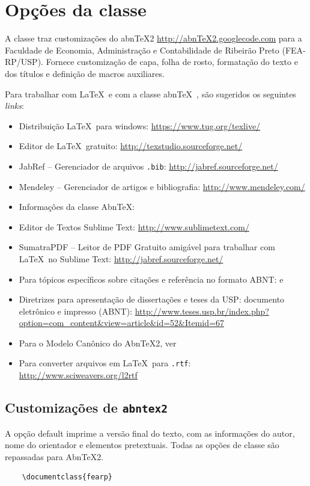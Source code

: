 \documentclass[rec]{fearp}
\begin{document}
\chapter{Opções da classe}

A classe traz customizações do abnTeX2 \url{http://abnTeX2.googlecode.com} para a Faculdade de Economia, Administração e Contabilidade de Ribeirão Preto (FEA-RP/USP). Fornece customização de capa, folha de rosto, formatação do texto e dos títulos e definição de macros auxiliares. 

Para trabalhar com \LaTeX\ e com a classe abn\TeX\ , são sugeridos os seguintes \textit{links}:
\begin{itemize}
  \item Distribuição \LaTeX\ para windows: \url{https://www.tug.org/texlive/}
  \item Editor de \LaTeX\ gratuito: \url{http://texstudio.sourceforge.net/}
  \item JabRef -- Gerenciador de arquivos \texttt{.bib}: \url{http://jabref.sourceforge.net/}
  \item Mendeley -- Gerenciador de artigos e bibliografia: \url{http://www.mendeley.com/}
  \item Informações da classe Abn\TeX : 
  \item Editor de Textos Sublime Text: \url{http://www.sublimetext.com/}
  \item SumatraPDF -- Leitor de PDF Gratuito amigável para trabalhar com \LaTeX\ no Sublime Text: \url{http://jabref.sourceforge.net/}
  \item Para tópicos específicos sobre citações e referência no formato ABNT: \cite{abntex22013b} e \cite{abntex22013c}
  \item Diretrizes para apresentação de dissertações e teses da USP: documento eletrônico e impresso (ABNT): \url{http://www.teses.usp.br/index.php?option=com_content&view=article&id=52&Itemid=67}
  \item Para o Modelo Canônico do AbnTeX2, ver 
  \item Para converter arquivos em \LaTeX\ para \texttt{.rtf}: \url{http://www.sciweavers.org/l2rtf}
\end{itemize}

\section{Customizações de \texttt{abntex2}}

A opção default imprime a versão final do texto, com as informações do autor, nome do orientador e elementos pretextuais. Todas as opções de classe são repassadas para Abn\TeX 2.
\begin{verbatim}
    \documentclass{fearp}
\end{verbatim} 
\end{document}
